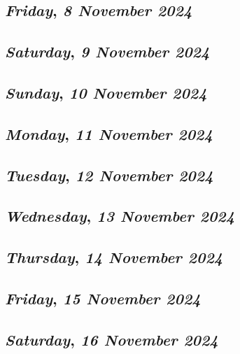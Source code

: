 \def\day{\textit{8 November 2024}}
\def\weekday{\textit{Friday}}
\subsection*{\weekday, \day}

\def\day{\textit{9 November 2024}}
\def\weekday{\textit{Saturday}}
\subsection*{\weekday, \day}

\def\day{\textit{10 November 2024}}
\def\weekday{\textit{Sunday}}
\subsection*{\weekday, \day}

\def\day{\textit{11 November 2024}}
\def\weekday{\textit{Monday}}
\subsection*{\weekday, \day}

\def\day{\textit{12 November 2024}}
\def\weekday{\textit{Tuesday}}
\subsection*{\weekday, \day}

\def\day{\textit{13 November 2024}}
\def\weekday{\textit{Wednesday}}
\subsection*{\weekday, \day}

\def\day{\textit{14 November 2024}}
\def\weekday{\textit{Thursday}}
\subsection*{\weekday, \day}

\def\day{\textit{15 November 2024}}
\def\weekday{\textit{Friday}}
\subsection*{\weekday, \day}

\def\day{\textit{16 November 2024}}
\def\weekday{\textit{Saturday}}
\subsection*{\weekday, \day}

